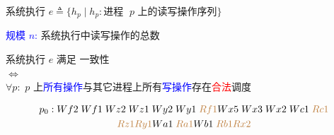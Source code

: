 \begin{frame}{}
  \begin{cdef}[系统执行]
    系统执行 $e \triangleq \{h_p \mid h_p: \text{进程 } \;p \text{ 上的读写操作序列}\}$

    \vspace{0.30cm}
    \textcolor{blue}{规模 $n$:} 系统执行中读写操作的总数
  \end{cdef}

  \vspace{0.50cm}
\end{frame}

\begin{frame}{}
  \begin{cdef}
    \begin{center}
      系统执行 $e$ 满足 {\it \PRAM{}} 一致性 \\[5pt]
      $\iff$ \\[5pt]
      $\forall p:$ $p$ 上\textcolor{blue}{所有操作}与其它进程上所有\textcolor{blue}{写操作}存在\textcolor{red}{合法}调度
    \end{center}
  \end{cdef}

  \vspace{0.30cm}

  \pause
  \vspace{-0.80cm}

  \begin{gather*}
    p_{0}: Wf2\; Wf1\; Wz2\; Wz1\; Wy2\; Wy1\; \textcolor{brown}{Rf1} 
    Wx5\; Wx3\; Wx2\; Wc1\; \textcolor{brown}{Rc1} \\
    \textcolor{brown}{Rz1} \textcolor{brown}{Ry1}
    Wa1\; \textcolor{brown}{Ra1} Wb1\; \textcolor{brown}{Rb1} \textcolor{brown}{Rx2}
  \end{gather*}
\end{frame}

